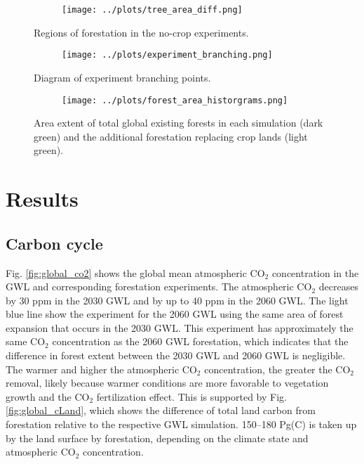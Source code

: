 \documentclass[]{article}
\begin{document}
\begin{figure}[H]
    \centering
    \begin{subfigure}[b]{\linewidth}
        \texttt{[image: ../plots/tree\_area\_diff.png]}
    \end{subfigure}
    \caption{Regions of forestation in the no-crop experiments.}
    \label{fig:forestation_on_crops}
\end{figure}

\begin{figure}[H]
    \centering
    \begin{subfigure}[b]{\linewidth}
        \texttt{[image: ../plots/experiment\_branching.png]}
    \end{subfigure}
    \caption{Diagram of experiment branching points.}
    \label{fig:experiment_branching}
\end{figure}

\begin{figure}[H]
    \centering
    \begin{subfigure}[b]{\linewidth}
        \texttt{[image: ../plots/forest\_area\_historgrams.png]}
    \end{subfigure}
    \caption{Area extent of total global existing forests in each simulation (dark green) and the additional forestation replacing crop lands (light green).}
    \label{fig:forestation_ammount}
\end{figure}

\section{Results}

\subsection{Carbon cycle}

Fig. \ref{fig:global_co2} shows the global mean atmospheric CO$_2$ concentration in the GWL and corresponding forestation experiments.
The atmospheric CO$_2$ decreases by 30 ppm in the 2030 GWL and by up to 40 ppm in the 2060 GWL.
The light blue line show the experiment for the 2060 GWL using the same area of forest expansion that occurs in the 2030 GWL. This experiment has approximately the same CO$_2$ concentration as the 2060 GWL forestation, which indicates that the difference in forest extent between the 2030 GWL and 2060 GWL is negligible.
The warmer and higher the atmospheric CO$_2$ concentration, the greater the CO$_2$ removal, likely because warmer conditions are more favorable to vegetation growth and the CO$_2$ fertilization effect.
This is supported by Fig. \ref{fig:global_cLand}, which shows the difference of total land carbon from forestation relative to the respective GWL simulation.
150–180 Pg(C) is taken up by the land surface by forestation, depending on the climate state and atmospheric CO$_2$ concentration.
\end{document}
